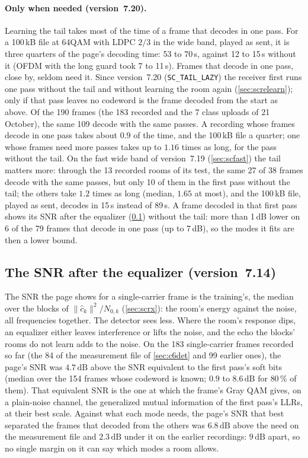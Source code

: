 \documentclass[11pt,a4paper]{article}
\newcommand{\dB}{\,\mathrm{dB}}
\newcommand{\code}[1]{\texttt{#1}}
\theoremstyle{remark}
\begin{document}
\paragraph{Only when needed (version~7.20).} Learning the tail takes most of the time of a frame that decodes in one pass. For a 100\,kB file at 64QAM with LDPC $2/3$ in the wide band, played as sent, it is three quarters of the page's decoding time: 53 to 70\,s, against 12 to 15\,s without it (OFDM with the long guard took 7 to 11\,s). Frames that decode in one pass, close by, seldom need it. Since version~7.20 (\code{SC\_TAIL\_LAZY}) the receiver first runs one pass without the tail and without learning the room again (\cref{sec:screlearn}); only if that pass leaves no codeword is the frame decoded from the start as above. Of the 190 frames (the 183 recorded and the 7 class uploads of 21 October), the same 109 decode with the same passes. A recording whose frames decode in one pass takes about $0.9$ of the time, and the 100\,kB file a quarter; one whose frames need more passes takes up to $1.16$ times as long, for the pass without the tail. On the fast wide band of version~7.19 (\cref{sec:scfast}) the tail matters more: through the 13 recorded rooms of its test, the same 27 of 38 frames decode with the same passes, but only 10 of them in the first pass without the tail; the others take $1.2$ times as long (median, $1.65$ at most), and the 100\,kB file, played as sent, decodes in 15\,s instead of 89\,s. A frame decoded in that first pass shows its SNR after the equalizer (\cref{sec:sceq}) without the tail: more than 1\,dB lower on 6 of the 79 frames that decode in one pass (up to 7\,dB), so the modes it fits are then a lower bound.

\subsection{The SNR after the equalizer (version~7.14)}
\label{sec:sceq}
The SNR the page shows for a single-carrier frame is the training's, the median over the blocks of $\|\hat c_k\|^2/N_{0,k}$ (\cref{sec:scrx}): the room's energy against the noise, all frequencies together. The detector sees less. Where the room's response dips, an equalizer either leaves interference or lifts the noise, and the echo the blocks' rooms do not learn adds to the noise. On the 183 single-carrier frames recorded so far (the 84 of the measurement file of \cref{sec:c6det} and 99 earlier ones), the page's SNR was $4.7\dB$ above the SNR equivalent to the first pass's soft bits (median over the 154 frames whose codeword is known; $0.9$ to $8.6\dB$ for $80\,\%$ of them). That equivalent SNR is the one at which the frame's Gray QAM gives, on a plain-noise channel, the generalized mutual information of the first pass's LLRs, at their best scale. Against what each mode needs, the page's SNR that best separated the frames that decoded from the others was $6.8\dB$ above the need on the measurement file and $2.3\dB$ under it on the earlier recordings: $9\dB$ apart, so no single margin on it can say which modes a room allows.
\end{document}
